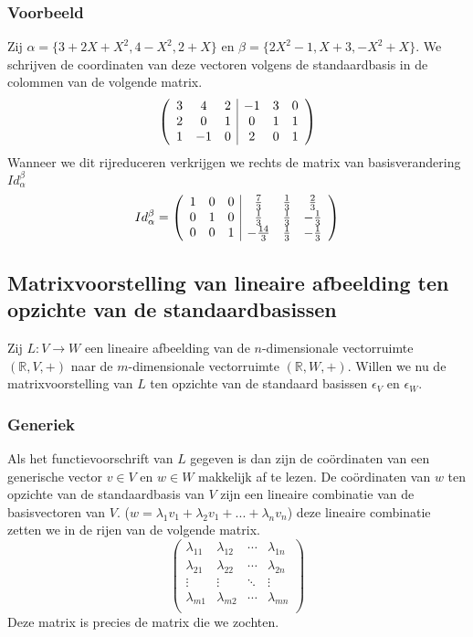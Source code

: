 \documentclass[lineaire_algebra_oplossingen.tex]{subfiles}
\begin{document}
\subsubsection*{Voorbeeld}
Zij $\alpha = \{3+2X+X^2,4-X^2,2+X\}$ en $\beta = \{2X^2-1,X+3,-X^2+X\}$.
We schrijven de coordinaten van deze vectoren volgens de standaardbasis in de colommen van de volgende matrix.
\[
\left(
\begin{array}{c c c | c c c}
3 & 4 & 2 & -1 & 3 & 0\\
2 & 0 & 1 & 0 & 1 & 1\\
1 & -1 & 0 & 2 & 0 & 1\\
\end{array}
\right)
\]
Wanneer we dit rijreduceren verkrijgen we rechts de matrix van basisverandering $Id_\alpha^\beta$
\[
Id_\alpha^\beta =
\left(
\begin{array}{c c c | c c c}
1 & 0 & 0 & \frac{7}{3} & \frac{1}{3} & \frac{2}{3}\\
0 & 1 & 0 & \frac{1}{3} & \frac{1}{3} & -\frac{1}{3}\\
0 & 0 & 1 & -\frac{14}{3} & \frac{1}{3} & -\frac{1}{3}\\
\end{array}
\right)
\]


\subsection{Matrixvoorstelling van lineaire afbeelding ten opzichte van de standaardbasissen}
Zij $L:V\rightarrow W$ een lineaire afbeelding van de $n$-dimensionale vectorruimte $(\mathbb{R},V,+)$ naar de $m$-dimensionale vectorruimte $(\mathbb{R},W,+)$. Willen we nu de matrixvoorstelling van $L$ ten opzichte van de standaard basissen $\epsilon_V$ en $\epsilon_W$.

\subsubsection*{Generiek}
Als het functievoorschrift van $L$ gegeven is dan zijn de co\"ordinaten van een generische vector $v\in V$ en $w\in W$ makkelijk af te lezen.
De co\"ordinaten van $w$ ten opzichte van de standaardbasis van $V$ zijn een lineaire combinatie van de basisvectoren van $V$. ($w = \lambda_1v_1+\lambda_2v_1+...+\lambda_nv_n$) deze lineaire combinatie zetten we in de rijen van de volgende matrix.
\[
\begin{pmatrix}
\lambda_{11} & \lambda_{12} & \cdots & \lambda_{1n} \\
\lambda_{21} & \lambda_{22} & \cdots & \lambda_{2n} \\
\vdots & \vdots & \ddots & \vdots\\
\lambda_{m1} & \lambda_{m2} & \cdots & \lambda_{mn} \\
\end{pmatrix}
\]
Deze matrix is precies de matrix die we zochten.
\end{document}
